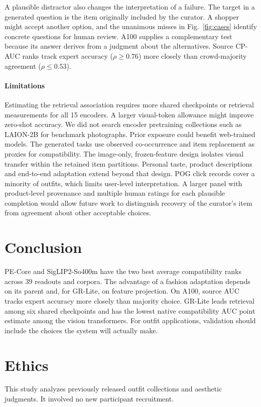 A plausible distractor also changes the interpretation of a failure. The target in a generated question is the item originally included by the curator. A shopper might accept another option, and the unanimous misses in Fig.~\ref{fig:cases} identify concrete questions for human review. A100 supplies a complementary test because its answer derives from a judgment about the alternatives. Source CP-AUC ranks track expert accuracy ($\rho\geq0.76$) more closely than crowd-majority agreement ($\rho\leq0.53$).

\paragraph{Limitations}
Estimating the retrieval association requires more shared checkpoints or retrieval measurements for all 15 encoders. A larger visual-token allowance might improve zero-shot accuracy. We did not search encoder pretraining collections such as LAION-2B for benchmark photographs. Prior exposure could benefit web-trained models. The generated tasks use observed co-occurrence and item replacement as proxies for compatibility. The image-only, frozen-feature design isolates visual transfer within the retained item partitions. Personal taste, product descriptions and end-to-end adaptation extend beyond that design. POG click records cover a minority of outfits, which limits user-level interpretation. A larger panel with product-level provenance and multiple human ratings for each plausible completion would allow future work to distinguish recovery of the curator's item from agreement about other acceptable choices.

\section{Conclusion}
PE-Core and SigLIP2-So400m have the two best average compatibility ranks across 39 readouts and corpora. The advantage of a fashion adaptation depends on its parent and, for GR-Lite, on feature projection. On A100, source AUC tracks expert accuracy more closely than majority choice. GR-Lite leads retrieval among six shared checkpoints and has the lowest native compatibility AUC point estimate among the vision transformers. For outfit applications, validation should include the choices the system will actually make.

\section*{Ethics}
This study analyzes previously released outfit collections and aesthetic judgments. It involved no new participant recruitment.

